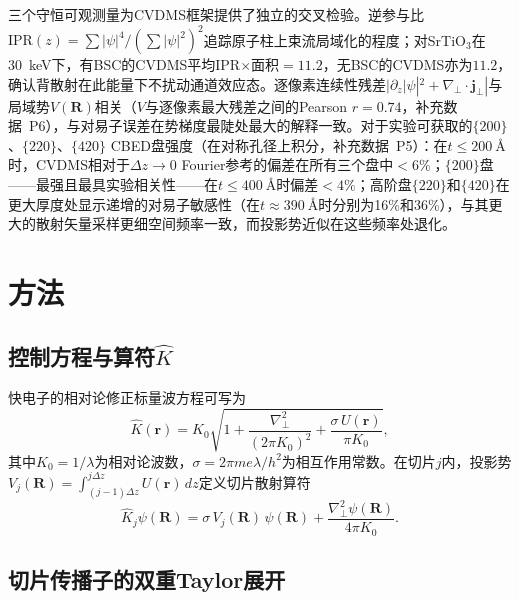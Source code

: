 \documentclass[twoside,11pt]{ctexart}
\begin{document}
三个守恒可观测量为CVDMS框架提供了独立的交叉检验。\label{sec:conserved-observables}逆参与比$\text{IPR}(z)=\sum|\psi|^4/(\sum|\psi|^2)^2$追踪原子柱上束流局域化的程度；对SrTiO$_3$在\SI{30}{\keV}下，有BSC的CVDMS平均IPR$\times$面积$=11.2$，无BSC的CVDMS亦为$11.2$，确认背散射在此能量下不扰动通道效应态。逐像素连续性残差$|\partial_z|\psi|^2+\nabla_\perp\cdot\mathbf{j}_\perp|$与局域势$V(\mathbf{R})$相关（$V$与逐像素最大残差之间的Pearson $r=0.74$，补充数据~P6），与对易子误差在势梯度最陡处最大的解释一致。对于实验可获取的$\{200\}$、$\{220\}$、$\{420\}$ CBED盘强度（在对称孔径上积分，补充数据~P5）：在$t\le\SI{200}{\angstrom}$时，CVDMS相对于$\Delta z\to0$ Fourier参考的偏差在所有三个盘中$<6\%$；$\{200\}$盘——最强且最具实验相关性——在$t\le\SI{400}{\angstrom}$时偏差$<4\%$；高阶盘$\{220\}$和$\{420\}$在更大厚度处显示递增的对易子敏感性（在$t\approx\SI{390}{\angstrom}$时分别为16\%和36\%），与其更大的散射矢量采样更细空间频率一致，而投影势近似在这些频率处退化。

\section{方法}

\subsection{控制方程与算符$\hat{K}$}

快电子的相对论修正标量波方程可写为~\cite{ChenVanDyck1997}
\begin{equation}\label{eq:KE}
\hat{K}(\mathbf{r})=K_0\sqrt{1+\frac{\nabla_\perp^2}{(2\pi K_0)^2}+\frac{\sigma\,U(\mathbf{r})}{\pi K_0}},
\end{equation}
其中$K_0=1/\lambda$为相对论波数，$\sigma=2\pi m e\lambda/h^2$为相互作用常数。在切片$j$内，投影势$V_j(\mathbf{R})=\int_{(j-1)\Delta z}^{j\Delta z}U(\mathbf{r})\,dz$定义切片散射算符
\begin{equation}\label{eq:Kj}
\hat{K}_j\psi(\mathbf{R})=\sigma\,V_j(\mathbf{R})\,\psi(\mathbf{R})+\frac{\nabla_\perp^2\psi(\mathbf{R})}{4\pi K_0}.
\end{equation}

\subsection{切片传播子的双重Taylor展开}
\end{document}
